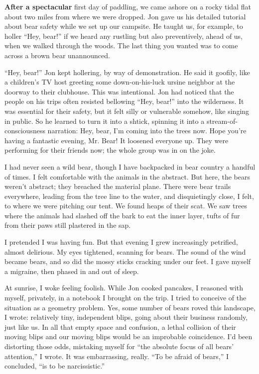 \textbf{After a spectacular} first day of paddling, we came ashore on a
rocky tidal flat about two miles from where we were dropped. Jon gave us
his detailed tutorial about bear safety while we set up our campsite. He
taught us, for example, to holler ``Hey, bear!'' if we heard any
rustling but also preventively, ahead of us, when we walked through the
woods. The last thing you wanted was to come across a brown bear
unannounced.

``Hey, bear!'' Jon kept hollering, by way of demonstration. He said it
goofily, like a children's TV host greeting some down-on-his-luck ursine
neighbor at the doorway to their clubhouse. This was intentional. Jon
had noticed that the people on his trips often resisted bellowing ``Hey,
bear!'' into the wilderness. It was essential for their safety, but it
felt silly or vulnerable somehow, like singing in public. So he learned
to turn it into a shtick, spinning it into a stream-of-consciousness
narration: Hey, bear, I'm coming into the trees now. Hope you're having
a fantastic evening, Mr. Bear! It loosened everyone up. They were
performing for their friends now; the whole group was in on the joke.

I had never seen a wild bear, though I have backpacked in bear country a
handful of times. I felt comfortable with the animals in the abstract.
But here, the bears weren't abstract; they breached the material plane.
There were bear trails everywhere, leading from the tree line to the
water, and disquietingly close, I felt, to where we were pitching our
tent. We found heaps of their scat. We saw trees where the animals had
slashed off the bark to eat the inner layer, tufts of fur from their
paws still plastered in the sap.

I pretended I was having fun. But that evening I grew increasingly
petrified, almost delirious. My eyes tightened, scanning for bears. The
sound of the wind became bears, and so did the mossy sticks cracking
under our feet. I gave myself a migraine, then phased in and out of
sleep.

At sunrise, I woke feeling foolish. While Jon cooked pancakes, I
reasoned with myself, privately, in a notebook I brought on the trip. I
tried to conceive of the situation as a geometry problem. Yes, some
number of bears roved this landscape, I wrote: relatively tiny,
independent blips, going about their business randomly, just like us. In
all that empty space and confusion, a lethal collision of their moving
blips and our moving blips would be an improbable coincidence. I'd been
distorting those odds, mistaking myself for ``the absolute focus of all
bears' attention,'' I wrote. It was embarrassing, really. ``To be afraid
of bears,'' I concluded, ``is to be narcissistic.''

